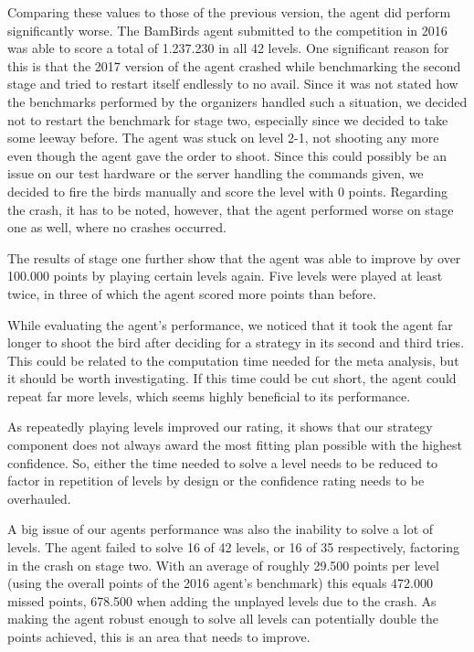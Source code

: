 Comparing these values to those of the previous version, the agent did perform significantly worse. The BamBirds agent submitted to the competition in 2016 was able to score a total of 1.237.230 in all 42 levels. One significant reason for this is that the 2017 version of the agent crashed while benchmarking the second stage and tried to restart itself endlessly to no avail. Since it was not stated how the benchmarks performed by the organizers handled such a situation, we decided not to restart the benchmark for stage two, especially since we decided to take some leeway before. The agent was stuck on level 2-1, not shooting any more even though the agent gave the order to shoot. Since this could possibly be an issue on our test hardware or the server handling the commands given, we decided to fire the birds manually and score the level with 0 points. Regarding the crash, it has to be noted, however, that the agent performed worse on stage one as well, where no crashes occurred.

The results of stage one further show that the agent was able to improve by over 100.000 points by playing certain levels again. Five levels were played at least twice, in three of which the agent scored more points than before.

While evaluating the agent's performance, we noticed that it took the agent far longer to shoot the bird after deciding for a strategy in its second and third tries. This could be related to the computation time needed for the meta analysis, but it should be worth investigating. If this time could be cut short, the agent could repeat far more levels, which seems highly beneficial to its performance.

As repeatedly playing levels improved our rating, it shows that our strategy component does not always award the most fitting plan possible with the highest confidence. So, either the time needed to solve a level needs to be reduced to factor in repetition of levels by design or the confidence rating needs to be overhauled.

A big issue of our agents performance was also the inability to solve a lot of levels. The agent failed to solve 16 of 42 levels, or 16 of 35 respectively, factoring in the crash on stage two. With an average of roughly 29.500 points per level (using the overall points of the 2016 agent's benchmark) this equals 472.000 missed points, 678.500 when adding the unplayed levels due to the crash. As making the agent robust enough to solve all levels can potentially double the points achieved, this is an area that needs to improve.
